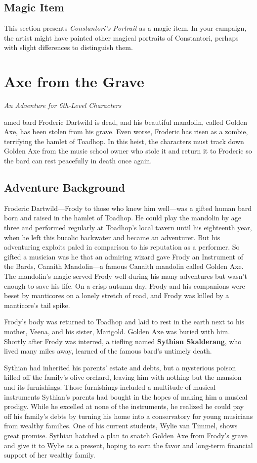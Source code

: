 \documentclass[10pt,a4paper,twoside,bg=print,twocolumn,openany,nodeprecatedcode]{dndbook}
\begin{document}
\section{Magic Item}
This section presents \textit{Constantori's Portrait} as a magic item. In your campaign, the artist might have painted other magical portraits of Constantori, perhaps with slight differences to distinguish them.

\chapter{Axe from the Grave}
\textit{An Adventure for 6th-Level Characters}

amed bard Froderic Dartwild is dead, and his beautiful mandolin, called Golden Axe, has been stolen from his grave. Even worse, Froderic has risen as a zombie, terrifying the hamlet of Toadhop. In this heist, the characters must track down Golden Axe from the music school owner who stole it and return it to Froderic so the bard can rest peacefully in death once again.


\section{Adventure Background}
Froderic Dartwild—Frody to those who knew him well—was a gifted human bard born and raised in the hamlet of Toadhop. He could play the mandolin by age three and performed regularly at Toadhop's local tavern until his eighteenth year, when he left this bucolic backwater and became an adventurer. But his adventuring exploits paled in comparison to his reputation as a performer. So gifted a musician was he that an admiring wizard gave Frody an Instrument of the Bards, Canaith Mandolin—a famous Canaith mandolin called Golden Axe. The mandolin's magic served Frody well during his many adventures but wasn't enough to save his life. On a crisp autumn day, Frody and his companions were beset by manticores on a lonely stretch of road, and Frody was killed by a manticore's tail spike.

Frody's body was returned to Toadhop and laid to rest in the earth next to his mother, Veena, and his sister, Marigold. Golden Axe was buried with him. Shortly after Frody was interred, a tiefling named \textbf{Sythian Skalderang}, who lived many miles away, learned of the famous bard's untimely death.

Sythian had inherited his parents' estate and debts, but a mysterious poison killed off the family's olive orchard, leaving him with nothing but the mansion and its furnishings. Those furnishings included a multitude of musical instruments Sythian's parents had bought in the hopes of making him a musical prodigy. While he excelled at none of the instruments, he realized he could pay off his family's debts by turning his home into a conservatory for young musicians from wealthy families. One of his current students, Wylie van Timmel, shows great promise. Sythian hatched a plan to snatch Golden Axe from Frody's grave and give it to Wylie as a present, hoping to earn the favor and long-term financial support of her wealthy family.
\end{document}
